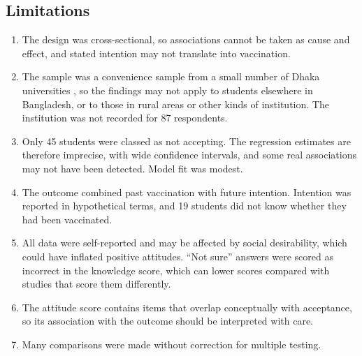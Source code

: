 \subsection*{Limitations}
\begin{enumerate}[leftmargin=*,itemsep=2pt]
\item The design was cross-sectional, so associations cannot be taken as cause and effect, and stated intention may not translate into vaccination.
\item The sample was a convenience sample from a small number of Dhaka universities , so the findings may not apply to students elsewhere in Bangladesh, or to those in rural areas or other kinds of institution. The institution was not recorded for 87 respondents.
\item Only 45 students were classed as not accepting. The regression estimates are therefore imprecise, with wide confidence intervals, and some real associations may not have been detected. Model fit was modest.
\item The outcome combined past vaccination with future intention. Intention was reported in hypothetical terms, and 19 students did not know whether they had been vaccinated.
\item All data were self-reported and may be affected by social desirability, which could have inflated positive attitudes. ``Not sure'' answers were scored as incorrect in the knowledge score, which can lower scores compared with studies that score them differently.
\item The attitude score contains items that overlap conceptually with acceptance, so its association with the outcome should be interpreted with care.
\item Many comparisons were made without correction for multiple testing.
\end{enumerate}
